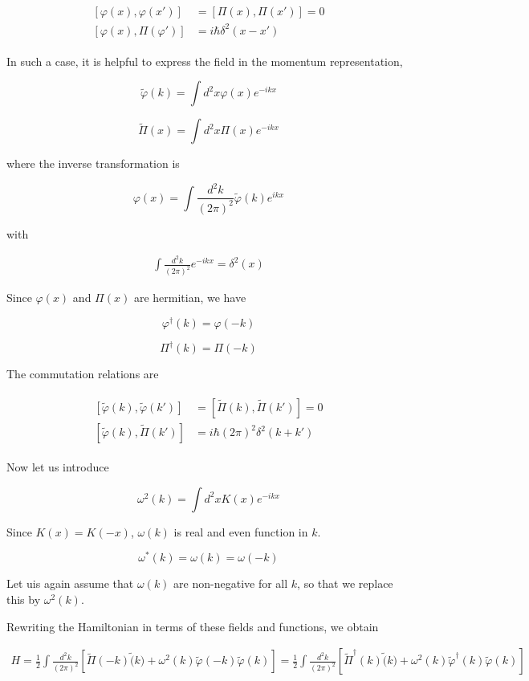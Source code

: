 ﻿\documentclass[twoside]{book}
\numberwithin{equation}{section}
\begin{document}
\begin{align}
\begin{split}
[\varphi(x),\varphi(x')] &= [\Pi(x),\Pi(x')] = 0\\
[\varphi(x),\Pi(\varphi')] &= i\hbar\delta^2(x-x')
\end{split}
\end{align}

In such a case, it is helpful to express the field in the momentum representation, 

\[\tilde{\varphi}(k) = \int d^2 x\varphi(x)e^{-ikx} \]

\[\tilde{\Pi}(x) = \int d^2 x \Pi(x) e^{-ikx} \]

where the inverse transformation is 

\[\varphi(x) = \int\frac{d^2 k}{(2\pi)^2} \tilde{\varphi}(k)e^{ikx} \]

with

\begin{align}
\int \frac{d^2 k}{(2\pi)^2}e^{-ikx} = \delta^2(x)
\end{align}

Since $\varphi(x)$ and $\Pi(x)$ are hermitian, we have

\[\varphi^\dagger(k) = \varphi(-k) \]

\[\Pi^\dagger(k) = \Pi(-k) \]

The commutation relations are

\begin{align}
\begin{split}
[\tilde{\varphi}(k), \tilde{\varphi}(k')] &= [\tilde{\Pi}(k), \tilde{\Pi}(k')] = 0\\
[\tilde{\varphi}(k),\tilde{\Pi}(k')] &= i\hbar(2\pi)^2\delta^2(k+k')
\end{split}
\end{align}

Now let us introduce 

\[\omega^2(k) = \int d^2x K(x)e^{-ikx} \]

Since $K(x) = K(-x)$, $\omega(k)$ is real and even function in $k$. 

\[\omega^*(k) = \omega(k) = \omega(-k) \]

Let uis again assume that $\omega(k)$ are non-negative for all $k$, so that we replace this by $\omega^2(k)$. 

Rewriting the Hamiltonian in terms of these fields and functions, we obtain

\begin{align}
H = \frac{1}{2}\int\frac{d^2 k}{(2\pi)^2}\left[\tilde{\Pi}(-k)\tilde(k)+\omega^2(k)\tilde{\varphi}(-k)\tilde{\varphi}(k)\right] = \frac{1}{2}\int\frac{d^2 k}{(2\pi)^2}\left[\tilde{\Pi}^\dagger (k)\tilde(k)+\omega^2(k)\tilde{\varphi}^\dagger(k)\tilde{\varphi}(k)\right]
\end{align}
\end{document}
